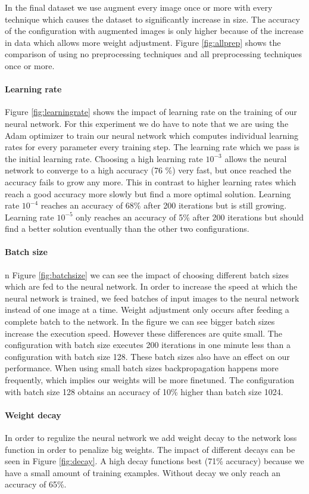 \documentclass{article}
\begin{document}
In the final dataset we use augment every image once or more with every technique which causes the dataset to significantly increase in size. The accuracy of the configuration with augmented images is only higher because of the increase in data which allows more weight adjustment. Figure \ref{fig:allprep} shows the comparison of using no preprocessing techniques and all preprocessing techniques once or more. 

\paragraph{Learning rate}
Figure \ref{fig:learningrate} shows the impact of learning rate on the training of our neural network. 
For this experiment we do have to note that we are using the Adam optimizer to train our neural network which computes individual learning rates for every parameter every training step. The learning rate which we pass is the initial learning rate. Choosing a high learning rate $10^{-3}$ allows the neural network to converge to a high accuracy (76 \%) very fast, but once reached the accuracy fails to grow any more.
This in contrast to higher learning rates which reach a good accuracy more slowly but find a more optimal solution. Learning rate $10^{-4}$ reaches an accuracy of 68\% after 200 iterations but is still growing. Learning rate $10^{-5}$ only reaches an accuracy of 5\% after 200 iterations but should find a better solution eventually than the other two configurations. 
\paragraph{Batch size}
n Figure \ref{fig:batchsize} we can see the impact of choosing different batch sizes which are fed to the neural network. In order to increase the speed at which the neural network is trained, we feed batches of input images to the neural network instead of one image at a time. 
Weight adjustment only occurs after feeding a complete batch to the network. In the figure we can see bigger batch sizes increase the execution speed. However these differences are quite small. The configuration with batch size executes 200 iterations in one minute less than a configuration with batch size 128. These batch sizes also have an effect on our performance. When using small batch sizes backpropagation happens more frequently, which implies our weights will be more finetuned. The configuration with batch size 128 obtains an accuracy of 10\% higher than batch size 1024.
\paragraph{Weight decay}
In order to regulize the neural network we add weight decay to the network loss function in order to penalize big weights. The impact of different decays can be seen in Figure \ref{fig:decay}. A high decay functions best (71\% accuracy) because we have a small amount of training examples. Without decay we only reach an accuracy of 65\%. 
\end{document}
